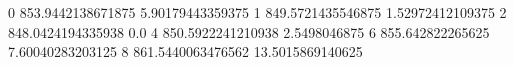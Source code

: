 0 853.9442138671875 5.90179443359375
1 849.5721435546875 1.52972412109375
2 848.0424194335938 0.0
4 850.5922241210938 2.5498046875
6 855.642822265625 7.60040283203125
8 861.5440063476562 13.5015869140625
